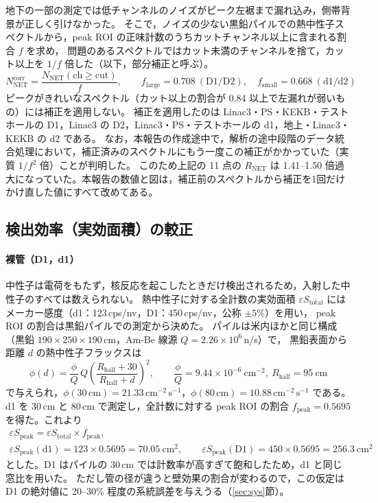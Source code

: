 \documentclass[a4paper,11pt]{ltjsarticle}
\newcommand{\RNET}{R_{\mathrm{NET}}}
\newcommand{\eSpk}{\varepsilon S_{\mathrm{peak}}}
\newcommand{\flux}{\mathrm{cm^{-2}\,s^{-1}}}
\begin{document}
地下の一部の測定では低チャンネルのノイズがピーク左裾まで漏れ込み，側帯背景が正しく引けなかった。
そこで，ノイズの少ない黒鉛パイルでの熱中性子スペクトルから，peak ROI の正味計数のうちカットチャンネル以上に含まれる割合 $f$ を求め，
問題のあるスペクトルではカット未満のチャンネルを捨て，カット以上を $1/f$ 倍した（以下，部分補正と呼ぶ）。
\begin{equation}
  N_{\mathrm{NET}}^{\mathrm{corr}} = \frac{N_{\mathrm{NET}}(\mathrm{ch}\ge \mathrm{cut})}{f},
  \qquad f_{\mathrm{large}}=0.708\ (\mathrm{D1/D2}),\quad f_{\mathrm{small}}=0.668\ (\mathrm{d1/d2})
\end{equation}
ピークがきれいなスペクトル（カット以上の割合が 0.84 以上で左漏れが弱いもの）には補正を適用しない。
補正を適用したのは Linac3・PS・KEKB・テストホールの D1，Linac3 の D2，Linac3・PS・テストホールの d1，地上・Linac3・KEKB の d2 である。
なお，本報告の作成途中で，解析の途中段階のデータ統合処理において，補正済みのスペクトルにもう一度この補正がかかっていた（実質 $1/f^2$ 倍）ことが判明した。
このため上記の 11 点の $\RNET$ は 1.41--1.50 倍過大になっていた。本報告の数値と図は，補正前のスペクトルから補正を1回だけかけ直した値にすべて改めてある。

\subsection{検出効率（実効面積）の較正}
\label{sec:calib}

\paragraph{裸管（D1，d1）}
中性子は電荷をもたず，核反応を起こしたときだけ検出されるため，入射した中性子のすべては数えられない。
熱中性子に対する全計数の実効面積 $\varepsilon S_{\mathrm{total}}$ にはメーカー感度（d1：123\,cps/nv，D1：450\,cps/nv，公称 $\pm5\%$）を用い，
peak ROI の割合は黒鉛パイルでの測定から決めた。
パイルは米内ほか\cite{yonei}と同じ構成（黒鉛 $190\times250\times190$\,cm，Am-Be 線源 $Q=2.26\times10^6$\,n/s）で，
黒鉛表面から距離 $d$ の熱中性子フラックスは
\begin{equation}
  \phi(d) = \frac{\phi}{Q}\,Q\left(\frac{R_{\mathrm{half}}+30}{R_{\mathrm{half}}+d}\right)^{2},
  \qquad \frac{\phi}{Q}=9.44\times10^{-6}\ \mathrm{cm^{-2}},\ R_{\mathrm{half}}=95\ \mathrm{cm}
\end{equation}
で与えられ，$\phi(30\,\mathrm{cm})=21.33\,\flux$，$\phi(80\,\mathrm{cm})=10.88\,\flux$ である。
d1 を 30\,cm と 80\,cm で測定し，全計数に対する peak ROI の割合 $f_{\mathrm{peak}}=0.5695$ を得た。これより
\begin{gather}
  \eSpk = \varepsilon S_{\mathrm{total}}\times f_{\mathrm{peak}}, \\
  \eSpk(\mathrm{d1}) = 123\times0.5695 = 70.05\ \mathrm{cm^2},\qquad
  \eSpk(\mathrm{D1}) = 450\times0.5695 = 256.3\ \mathrm{cm^2}
\end{gather}
とした。D1 はパイルの 30\,cm では計数率が高すぎて飽和したため，d1 と同じ窓比を用いた。
ただし管の径が違うと壁効果の割合が変わるので，この仮定は D1 の絶対値に 20--30\% 程度の系統誤差を与えうる（\ref{sec:sys}節）。
\end{document}
